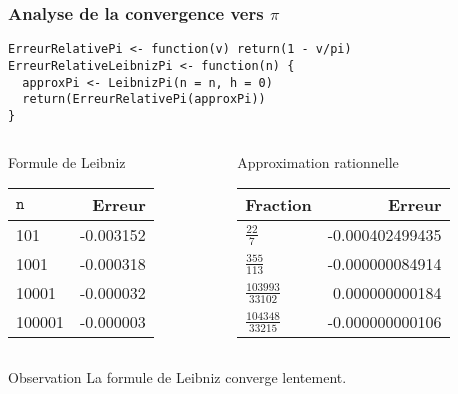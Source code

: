 \documentclass[10pt]{beamer}
\begin{document}
\begin{frame}[fragile]
  \frametitle{Analyse de la convergence vers $\pi$}
  \begin{lstlisting}[style=editor]
ErreurRelativePi <- function(v) return(1 - v/pi)
ErreurRelativeLeibnizPi <- function(n) {
  approxPi <- LeibnizPi(n = n, h = 0)
  return(ErreurRelativePi(approxPi))
}
\end{lstlisting}



\begin{columns}[t]
\begin{column}{0.48\textwidth}
  \begin{exampleblock}{Formule de Leibniz}
    \begin{tabular}{lr}
      \toprule
    $\mathtt{n}$ & Erreur   \\
    \midrule
    101          & -0.003152 \\
    1001         & -0.000318 \\
    10001        & -0.000032 \\
    100001       & -0.000003 \\
      \bottomrule
  \end{tabular}

  \end{exampleblock}

\end{column}
\begin{column}{0.48\textwidth}
  \begin{exampleblock}{Approximation rationnelle}
    \begin{tabular}{lr}
    \toprule
    Fraction               & Erreur          \\
    \midrule
    $\frac{22}{7}$         & -0.000402499435 \\
    $\frac{355}{113}$      & -0.000000084914 \\
    $\frac{103993}{33102}$ & 0.000000000184  \\
    $\frac{104348}{33215}$ & -0.000000000106 \\
    \bottomrule
  \end{tabular}
  \end{exampleblock}
\end{column}
\end{columns}



\begin{alertblock}{Observation}
  \alert{La formule de Leibniz converge lentement.}
\end{alertblock}

\end{frame}
\end{document}
